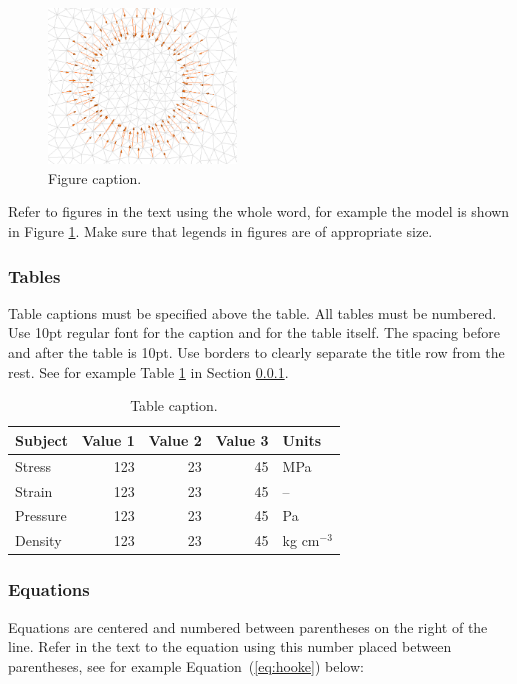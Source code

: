 \documentclass[]{YIC2015}
\begin{document}
\begin{figure}[htbp]
\centering %
\includegraphics[width=50mm]{figure1.eps}
\caption{Figure caption.}
\label{fig:figure-manel1}
\end{figure}

Refer to figures in the text using the whole word, for example the model is shown in Figure \ref{fig:figure-manel1}. Make sure that legends in figures are of appropriate size.
%

\subsubsection{Tables}
\label{sec:Tables}
Table captions must be specified above the table. All tables must be numbered.
Use 10pt regular font for the caption and for the table itself. The spacing before and after the table is 10pt. Use borders to clearly separate the title row from the rest. See for example Table \ref{tab:table-silva1} in Section \ref{sec:Tables}.

\begin{table}[htdp]
\caption{Table caption.}
\centering
\begin{tabular}{lrrrl}
\hline\hline
\textbf{Subject} & \textbf{Value 1} & \textbf{Value 2} & \textbf{Value 3} & \textbf{Units} \\ \hline
Stress   &   123 & 23  & 45  &  MPa \\
Strain   &   123 & 23  & 45  &  --  \\
Pressure &   123 & 23  & 45  &  Pa  \\
Density  &   123 & 23  & 45  &  kg cm$^{-3}$ \\ \hline\hline
\end{tabular}
\label{tab:table-silva1}
\end{table}

\subsubsection{Equations}
Equations are centered and numbered between parentheses on the right of the line. Refer in the text to the equation using this number placed between parentheses, see for example Equation~(\ref{eq:hooke}) below:
\end{document}
